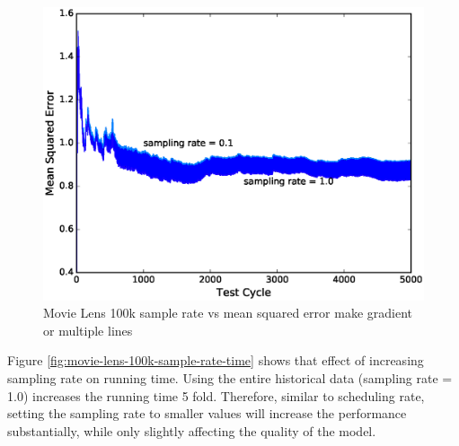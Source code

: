 \documentclass{sig-alternate-05-2015}
\begin{document}
\begin{figure}[H]
\centering
\includegraphics[width=\columnwidth]{../images/experiment-results/movie-lens-100k-sampling-rate.eps}
\caption{Movie Lens 100k sample rate vs mean squared error{\color{red} make gradient or multiple lines}}
\label{fig:movie-lens-100k-sample-rate}
\end{figure}

Figure \ref{fig:movie-lens-100k-sample-rate-time} shows that effect of increasing sampling rate on running time.
Using the entire historical data (sampling rate = 1.0) increases the running time 5 fold. 
Therefore, similar to scheduling rate, setting the sampling rate to smaller values will increase the performance substantially, while only slightly affecting the quality of the model.
\end{document}
